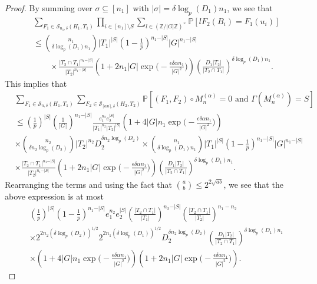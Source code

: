 \documentclass[12pt]{amsart}
\theoremstyle{definition}
\newcommand{\PPP}{\mathbb{P}}
\newcommand{\SSS}[3]{\mathcal{S}_{#1}(#2,#3)}
\newcommand{\Mna}{M_{n}^{(\alpha)}}
\newcommand{\abs}[1]{\vert#1\vert}
\newcommand{\Z}{\mathbb{Z}}
\newcommand{\ceil}[1]{\lceil#1\rceil}
\begin{document}
\begin{proof}
By summing over $\sigma\subseteq[n_1]$ with $\abs{\sigma}= \delta\log_p(D_1) n_1$, we see that
\begin{align*}
&\sum_{F_1\in \SSS{n_1,\delta}{H_1}{T_1}}
\prod_{i\in [n_1]\setminus S} \sum_{l\in (\Z/\abs{G}\Z)^{\times}} \PPP[l F_2(B_i)= F_1(u_i)]\\
&\leq \binom{n_1}{\delta\log_p(D_1) n_1}
\abs{T_1}^{\abs{S}}
(1-\tfrac{1}{p})^{n_1-\abs{S}}\abs{G}^{n_1-\abs{S}} \\
&\quad\quad\times\frac{\abs{T_2\cap T_1}^{n_1-\abs{S}}}{\abs{T_2}^{n_1-\abs{S}}}
\left(1+2n_1\abs{G}\exp\Big(-\frac{\epsilon\delta \alpha n_1}{|G|^2}\Big)\right)
\left(\frac{D_1 \abs{T_2}}{\abs{T_2\cap T_1}}\right)^{\delta\log_p(D_1) n_1}.
\end{align*}
This implies that
\begin{align*}
&\sum_{F_1\in \SSS{n,\delta}{H_1}{T_1}}
\sum_{F_2\in \SSS{\ceil{\alpha n},\delta}{H_2}{T_2}}
\PPP[(F_1,F_2)\circ \Mna=0 \text{ and } \Gamma(\Mna)=S]\\
&\leq (\tfrac{1}{p})^{\abs{S}} (\tfrac{1}{\abs{G}})^{n_1-\abs{S}}
\frac{e_1^{n_2} e_2^{\abs{S}}}{\abs{T_1}^{n_2} \abs{T_2}^{\abs{S}}}
\left(1+4\abs{G}n_1 \exp\Big(-\frac{\epsilon \delta \alpha n_1}{|G|^2}\Big) \right)\\
&\times
\binom{n_2}{\delta n_2\log_p(D_2)} \abs{T_2}^{n_2} D_2^{\delta n_2\log_p(D_2)}
\times \binom{n_1}{\delta\log_p(D_1) n_1}
\abs{T_1}^{\abs{S}}
(1-\tfrac{1}{p})^{n_1-\abs{S}}\abs{G}^{n_1-\abs{S}} \\
&\times\frac{\abs{T_2\cap T_1}^{n_1-\abs{S}}}{\abs{T_2}^{n_1-\abs{S}}}
\left(1+2n_1\abs{G}\exp\Big(-\frac{\epsilon\delta \alpha n_1}{|G|^2}\Big)\right)
\left(\frac{D_1 \abs{T_2}}{\abs{T_2\cap T_1}}\right)^{\delta\log_p(D_1) n_1}.
\end{align*}
Rearranging the terms and using the fact that $\binom{a}{b}\leq 2^{2\sqrt{ab}}$, we see that the above expression is at most
\begin{align*}
&(\tfrac{1}{p})^{\abs{S}}  (1-\tfrac{1}{p})^{n_1-\abs{S}}
e_1^{n_2} e_2^{\abs{S}}
\left(\frac{\abs{T_2\cap T_1}}{\abs{T_1}}\right)^{n_2-\abs{S}}
\left(\frac{\abs{T_2\cap T_1}}{\abs{T_2}}\right)^{n_1-n_2}\\
&\times
2^{2n_2(\delta\log_p(D_2))^{1/2}}
2^{2n_1(\delta\log_p(D_1))^{1/2}}
D_2^{\delta n_2\log_p(D_2)}
\left(\frac{D_1 \abs{T_2}}{\abs{T_2\cap T_1}}\right)^{\delta\log_p(D_1) n_1}\\
&\times \left(1+4\abs{G}n_1 \exp\Big(-\frac{\epsilon \delta \alpha n_1}{|G|^2}\Big) \right)
\left(1+2n_1\abs{G}\exp\Big(-\frac{\epsilon\delta \alpha n_1}{|G|^2}\Big)\right).

\end{align*}
\end{proof}
\end{document}
